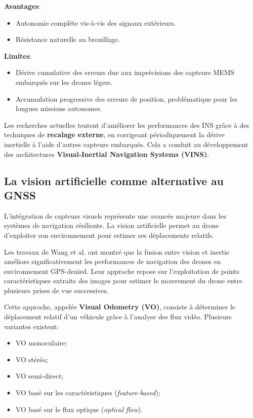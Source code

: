 \documentclass[12pt, a4paper, twoside, openright]{report}
\begin{document}
\textbf{Avantages}:
\begin{itemize}
    \item Autonomie complète vis-à-vis des signaux extérieurs.
    \item Résistance naturelle au brouillage.
\end{itemize}

\textbf{Limites}:
\begin{itemize}
    \item Dérive cumulative des erreurs due aux imprécisions des capteurs MEMS embarqués sur les drones légers.
    \item Accumulation progressive des erreurs de position, problématique pour les longues missions autonomes.
\end{itemize}

Les recherches actuelles tentent d’améliorer les performances des INS grâce à des techniques de \textbf{recalage externe}, en corrigeant périodiquement la dérive inertielle à l’aide d’autres capteurs embarqués. Cela a conduit au développement des architectures \textbf{Visual-Inertial Navigation Systems (VINS)}.

\subsection{La vision artificielle comme alternative au GNSS}
L’intégration de capteurs visuels représente une avancée majeure dans les systèmes de navigation résiliente. La vision artificielle permet au drone d’exploiter son environnement pour estimer ses déplacements relatifs.

Les travaux de Wang et al.\cite{wang2013visual} ont montré que la fusion entre vision et inertie améliore significativement les performances de navigation des drones en environnement GPS-denied. Leur approche repose sur l’exploitation de points caractéristiques extraits des images pour estimer le mouvement du drone entre plusieurs prises de vue successives.

Cette approche, appelée \textbf{Visual Odometry (VO)}, consiste à déterminer le déplacement relatif d’un véhicule grâce à l’analyse des flux vidéo. Plusieurs variantes existent:
\begin{itemize}
    \item VO monoculaire;
    \item VO stéréo;
    \item VO semi-direct;
    \item VO basé sur les caractéristiques (\textit{feature-based});
    \item VO basé sur le flux optique (\textit{optical flow}).
\end{itemize}
\end{document}
